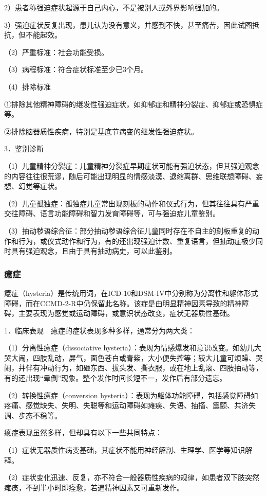 2）患者称强迫症状起源于自己内心，不是被别人或外界影响强加的。

3）强迫症状反复出现，患儿认为没有意义，并感到不快，甚至痛苦，因此试图抵抗，但不能起效。

（2）严重标准：社会功能受损。

（3）病程标准：符合症状标准至少已3个月。

（4）排除标准

①排除其他精神障碍的继发性强迫症状，如抑郁症和精神分裂症、抑郁症或恐惧症等。

②排除脑器质性疾病，特别是基底节病变的继发性强迫症状。

3．鉴别诊断

（1）儿童精神分裂症：儿童精神分裂症早期症状可能有强迫状态，但其强迫观念的内容往往很荒谬，随后可能出现明显的情感淡漠、退缩离群、思维联想障碍、妄想、幻觉等症状。

（2）儿童孤独症：孤独症儿童常出现刻板的动作和仪式行为，但其往往具有严重交往障碍、语言功能障碍和智力发育障碍等，可与强迫症儿童鉴别。

（3）抽动秽语综合征：部分抽动秽语综合征儿童同时存在不自主的刻板重复的动作和行为，或仪式动作和行为，有的还出现强迫计数、重复语言，但抽动症极少同时具有强迫观念，且由于具有抽动病史，可以此鉴别。

\subsubsection{癔症}

癔症（hysteria）是传统用词，在ICD-10和DSM-IV中分别称为分离性和躯体形式障碍，而在CCMD-2-R中仍保留此名称。该症是由明显精神因素导致的精神障碍，主要表现为感觉或运动障碍，或意识状态改变，症状无器质性基础。

1．临床表现　癔症的症状表现多种多样，通常分为两大类：

（1）分离性癔症（dissociative
hysteria）：表现为情感爆发和意识改变。如幼儿大哭大闹，四肢乱动，屏气，面色苍白或青紫，大小便失控等；较大儿童可烦躁、哭闹，并伴有冲动行为，如砸东西、拔头发、撕衣服，或在地上乱滚、四肢抽动等，有的还出现“晕倒”现象。整个发作时间长短不一，发作后有部分遗忘。

（2）转换性癔症（conversion
hysteria）：表现为躯体功能障碍，包括感觉障碍如疼痛、感觉缺失、失明、失聪等和运动障碍如瘫痪、失语、抽搐、震颤、共济失调、步态不稳等。

癔症表现虽然多样，但却具有以下一些共同特点：

（1）症状无器质性病变基础，其症状不能用神经解剖、生理学、医学等知识解释。

（2）症状变化迅速、反复，亦不符合一般器质性疾病的规律，如患者双下肢突然瘫痪，不到半小时即痊愈，若遇精神因素又可重新发作。

